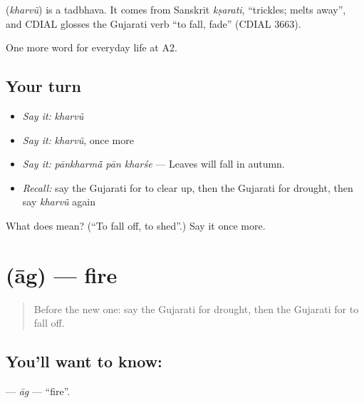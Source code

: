 \begin{cousinweb}
\textbf{} (\emph{kharvũ}) is a tadbhava. It comes from Sanskrit \emph{kṣarati}, \textquotedblleft{}trickles; melts away\textquotedblright{}, and CDIAL glosses the Gujarati verb \textquotedblleft{}to fall, fade\textquotedblright{} (CDIAL 3663).
\end{cousinweb}

\begin{grammarlens}[title={What you've built}]
One more word for everyday life at A2.
\end{grammarlens}

\subsection*{Your turn}
\begin{itemize}
\raggedright
  \item \emph{Say it:} \emph{kharvũ}
  \item \emph{Say it:} \emph{kharvũ}, once more
  \item \emph{Say it:} \emph{pānkharmā̃ pān kharśe} — Leaves will fall in autumn.
  \item \emph{Recall:} say the Gujarati for to clear up, then the Gujarati for drought, then say \emph{kharvũ} again
\end{itemize}

\begin{tcolorbox}[breakable,colback=teal!4,colframe=teal!35!black,title={Before you move on}]
What does  mean? (\textquotedblleft{}To fall off, to shed\textquotedblright{}.) Say it once more.
\end{tcolorbox}
\section[\texorpdfstring{\gu{આગ} (āg)}{આગ (āg)}]{ (āg) — fire}

\label{lesson:GU-C221-ag}



\begin{quote}
Before the new one: say the Gujarati for drought, then the Gujarati for to fall off.
\end{quote}

\subsection*{You'll want to know: }
\textbf{} — \emph{āg} — \textquotedblleft{}fire\textquotedblright{}.

